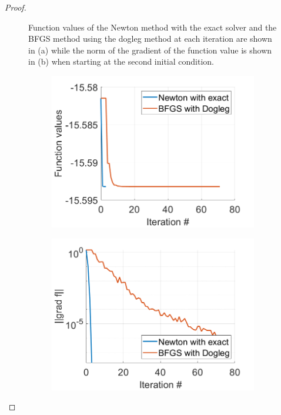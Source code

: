 \documentclass[12pt]{report}
\begin{document}
\begin{problem}
\begin{proof}
\begin{figure}[H]
    \caption{Function values of the Newton method with the exact solver and the BFGS method using the dogleg method at each iteration are shown in (a) while the norm of the gradient of the function value is shown in (b) when starting at the second initial condition.}
    \label{fig5}
\end{figure}
\begin{figure}[H]
    \begin{subfigure}[b]{0.5\linewidth}
        \centering
        \includegraphics[width=\linewidth]{images/3-3-fun.png}
        \caption{}
        \label{fig6:a}
        \vspace{4ex}
    \end{subfigure}%
    \begin{subfigure}[b]{0.5\linewidth}
        \centering
        \includegraphics[width=\linewidth]{images/3-3-grad.png}

\end{subfigure}
\end{figure}
\end{proof}
\end{problem}
\end{document}
